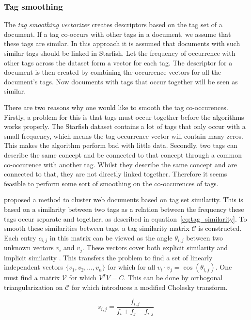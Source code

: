 \subsubsection{Tag smoothing}
The \emph{tag smoothing vectorizer} creates descriptors based on the tag set of a
document. If a tag co-occurs with other tags in a document, we assume that these
tags are similar. In this approach it is assumed that documents with such similar tags 
should be linked in Starfish. Let the frequency of occurrence
with other tags across the dataset form a vector for each tag. The
descriptor for a document is then created by combining the occurrence vectors
for all the document's tags. Now documents with tags that occur together will
be seen as similar.

There are two reasons why one would like to smooth the tag co-occurences.
Firstly, a problem for this is that tags must occur together before the
algorithms works properly. The Starfish dataset contains a lot of tags that
only occur with a small frequency, which means the tag occurrence vector will
contain many zeros. This makes the algorithm perform bad with little data.
Secondly, two tags can describe the same concept and be connected to that
concept through a common co-occurence with another tag. Whilst they describe
the same concept and are connected to that, they are not directly linked
together. Therefore it seems feasible to perform some sort of smoothing on the
co-occurences of tags.

\citet{zhou2011web} proposed a method to cluster web documents based on tag set
similarity. This is based on a similarity between two tags as a relation
between the frequency these tags occur separate and together, as described in
equation~\ref{eq:tag_similarity}. To smooth these similarities between tags, a
tag similarity matrix $\mathcal{C}$ is constructed. Each entry $c_{i,j}$ in
this matrix can be viewed as the angle $\theta_{i,j}$ between two unknown
vectors $v_i$ and $v_j$. These vectors cover both explicit similarity and
implicit similarity \citep{park2010vector}. This transfers the problem to find
a set of linearly independent vectors $\{v_1,v_2,\ldots,v_n\}$ for which for
all $v_i \cdot v_j = \cos(\theta_{i,j})$. One must find a matrix $\mathcal{V}$
for which $V^TV = C$. This can be done by orthogonal triangularization on
$\mathcal{C}$ for which \citeauthor{zhou2011web} introduces a modified Cholesky
transform.

\begin{equation} \label{eq:tag_similarity}
s_{i,j} = \frac{f_{i,j}}{f_i + f_j - f_{i,j}}
\end{equation}


